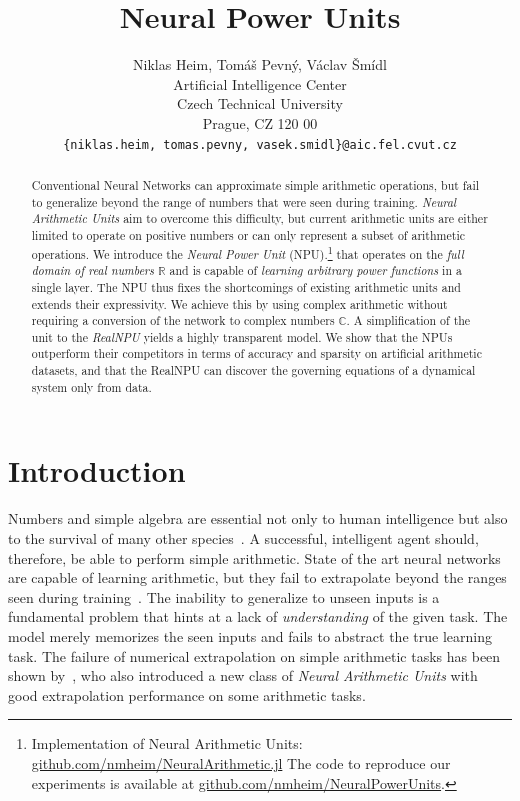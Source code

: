 \documentclass[9pt]{article}
\title{Neural Power Units}
\author{
  Niklas Heim,
  Tom\'a\v s Pevn\'y,
  V\'aclav \v Sm\'idl\\
  Artificial Intelligence Center\\
  Czech Technical University\\
  Prague, CZ 120 00\\
  \texttt{\{niklas.heim, tomas.pevny, vasek.smidl\}@aic.fel.cvut.cz}\\
}
\begin{document}
\maketitle

\begin{abstract}
  Conventional Neural Networks can approximate simple arithmetic operations,
  but fail to generalize beyond the range of numbers that were seen during
  training.  \emph{Neural Arithmetic Units} aim to overcome this difficulty,
  but current arithmetic units are either limited to operate on positive
  numbers or can only represent a subset of arithmetic operations. We introduce
  the \emph{Neural Power Unit} (NPU).\footnote{
    Implementation of Neural Arithmetic Units: \url{github.com/nmheim/NeuralArithmetic.jl}
    The code to reproduce our experiments is available at \url{github.com/nmheim/NeuralPowerUnits}.
  }
  that operates on the \emph{full domain of
  real numbers} $\mathbb{R}$ and is capable of \emph{learning arbitrary power functions} in
  a single layer.  The NPU thus fixes the shortcomings of existing arithmetic
  units and extends their expressivity. We achieve this by using
  complex arithmetic without requiring a conversion of the network to complex
  numbers $\mathbb{C}$.
  A simplification of the unit to the \emph{RealNPU} yields a highly transparent model.
  We show that the NPUs outperform their competitors in terms of
  accuracy and sparsity on artificial arithmetic datasets, and that the RealNPU can discover
  the governing equations of a dynamical system only from data.
\end{abstract}


\section{Introduction}%
\label{sec:introduction}

Numbers and simple algebra are essential not only to human intelligence but
also to the survival of many other
species~\citep{dehaene_number_2011,gallistel_finding_2018}. A successful,
intelligent agent should, therefore, be able to perform simple arithmetic.  State
of the art neural networks are capable of learning arithmetic, but they
fail to extrapolate beyond the ranges seen during
training~\citep{suzgun_evaluating_2018,lake_generalization_2018}.  The
inability to generalize to unseen inputs is a fundamental problem that hints at
a lack of \emph{understanding} of the given task. The model merely memorizes
the seen inputs and fails to abstract the true learning task.  The failure of
numerical extrapolation on simple arithmetic tasks has been shown
by~\cite{trask_neural_2018}, who also introduced a new class of \emph{Neural
Arithmetic Units} with good extrapolation performance on some arithmetic
tasks.
\end{document}
